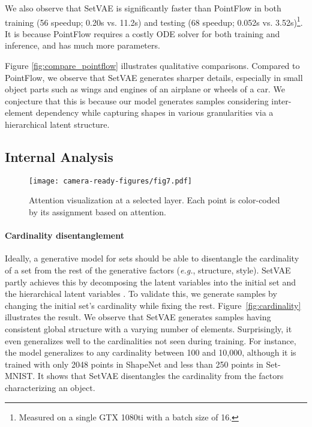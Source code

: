 \documentclass[final]{arxiv/cvpr}
\begin{document}
We also observe that SetVAE is significantly faster than PointFlow in both training (56 speedup; 0.20s vs. 11.2s) and testing (68 speedup; 0.052s vs. 3.52s)\footnote{Measured on a single GTX 1080ti with a batch size of 16.}.
It is because PointFlow requires a costly ODE solver for both training and inference, and has much more parameters.

Figure \ref{fig:compare_pointflow} illustrates qualitative comparisons.
Compared to PointFlow, we observe that SetVAE generates sharper details, especially in small object parts such as wings and engines of an airplane or wheels of a car.
We conjecture that this is because our model generates samples considering inter-element dependency while capturing shapes in various granularities via a hierarchical latent structure.

\subsection{Internal Analysis}
\label{sec:qualitative}

\begin{figure}[!t]
    \centering
    \texttt{[image: camera-ready-figures/fig7.pdf]}
    \vspace{-0.7cm}
    \caption{
    Attention visualization at a selected layer.
    Each point is color-coded by its assignment based on attention.
    }
    \label{fig:subset}
    \vspace{-0.6cm}
\end{figure}

\paragraph{Cardinality disentanglement}
Ideally, a generative model for sets should be able to disentangle the cardinality of a set from the rest of the generative factors (\emph{e.g.}, structure, style). 
SetVAE partly achieves this by decomposing the latent variables into the initial set  and the hierarchical latent variables .
To validate this, we generate samples by changing the initial set's cardinality while fixing the rest.
Figure~\ref{fig:cardinality} illustrates the result.
We observe that SetVAE generates samples having consistent global structure with a varying number of elements.
Surprisingly, it even generalizes well to the cardinalities not seen during training.
For instance, the model generalizes to any cardinality between 100 and 10,000, although it is trained with only 2048 points in ShapeNet and less than 250 points in Set-MNIST.
It shows that SetVAE disentangles the cardinality from the factors characterizing an object.
\end{document}
